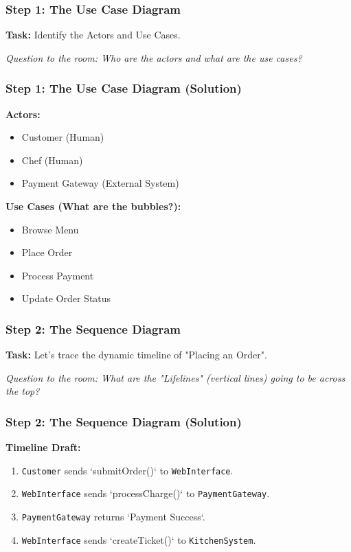 \documentclass[xcolor=table]{beamer}
\begin{document}
\begin{frame}
    \frametitle{Step 1: The Use Case Diagram}
    \textbf{Task:} Identify the Actors and Use Cases.
    
    \vspace{0.5cm}
    \textit{Question to the room: Who are the actors and what are the use cases?}
\end{frame}

\begin{frame}
    \frametitle{Step 1: The Use Case Diagram (Solution)}
    \textbf{Actors:}
    \begin{itemize}
        \item Customer (Human)
        \item Chef (Human)
        \item Payment Gateway (External System)
    \end{itemize}
    
    \vspace{0.2cm}
    \textbf{Use Cases (What are the bubbles?):}
    \begin{itemize}
        \item Browse Menu
        \item Place Order
        \item Process Payment
        \item Update Order Status
    \end{itemize}
\end{frame}

\begin{frame}
    \frametitle{Step 2: The Sequence Diagram}
    \textbf{Task:} Let's trace the dynamic timeline of "Placing an Order".
    
    \vspace{0.3cm}
    \textit{Question to the room: What are the "Lifelines" (vertical lines) going to be across the top?}
\end{frame}

\begin{frame}
    \frametitle{Step 2: The Sequence Diagram (Solution)}
    \textbf{Timeline Draft:}
    \begin{enumerate}
        \item \texttt{Customer} sends `submitOrder()` to \texttt{WebInterface}.
        \item \texttt{WebInterface} sends `processCharge()` to \texttt{PaymentGateway}.
        \item \texttt{PaymentGateway} returns `Payment Success`.
        \item \texttt{WebInterface} sends `createTicket()` to \texttt{KitchenSystem}.
    \end{enumerate}
\end{frame}
\end{document}
